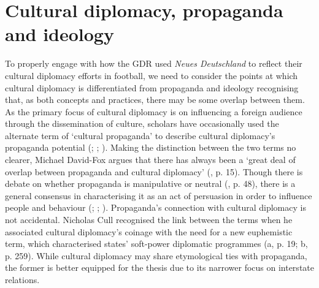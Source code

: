 \section{Cultural diplomacy, propaganda and ideology}

To properly engage with how the GDR used \textit{Neues Deutschland} to reflect their cultural diplomacy efforts in football, we need to consider the points at which cultural diplomacy is differentiated from propaganda and ideology recognising that, as both concepts and practices, there may be some overlap between them. As the primary focus of cultural diplomacy is on influencing a foreign audience through the dissemination of culture, scholars have occasionally used the alternate term of ‘cultural propaganda’ to describe cultural diplomacy’s propaganda potential (\cite{prevots1998}; \cite{david-fox2011}; \cite{faircloughwiggins2016}). Making the distinction between the two terms no clearer, Michael David-Fox argues that there has always been a ‘great deal of overlap between propaganda and cultural diplomacy’ (\citeyear{david-fox2011}, p. 15). Though there is debate on whether propaganda is manipulative or neutral (\cite{diggs-brown2011}, p. 48), there is a general consensus in characterising it as an act of persuasion in order to influence people and behaviour (\cite{blackroberts2011}; \cite{auerbachcastronovo2013}; \cite{milleretal2016}). Propaganda’s connection with cultural diplomacy is not accidental. Nicholas Cull recognised the link between the terms when he associated cultural diplomacy’s coinage with the need for a new euphemistic term, which characterised states' soft-power diplomatic programmes (\citeyear{cull2008a}a, p. 19; \citeyear{cull2008b}b, p. 259). While cultural diplomacy may share etymological ties with propaganda, the former is better equipped for the thesis due to its narrower focus on interstate relations.

